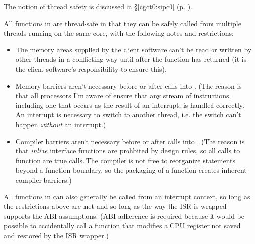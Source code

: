 The notion of thread safety is discussed 
in \S{}\ref{cgct0:sipc0} (p.  \pageref{cgct0:sipc0}).  

All functions in \emph{\productbasenameshort{}} are 
thread-safe in that they can be safely called from multiple 
threads running on the same core, with the following notes 
and restrictions: 

\begin{itemize}
\item The memory areas supplied by the client software
      can't be read or written by other threads in a 
      conflicting way until after the
      \emph{\productbasenameshort{}} function has returned
      (it is the client software's responsibility to ensure 
      this).
\item Memory barriers aren't necessary before or after calls
      into \emph{\productbasenameshort{}}\@.  (The reason is 
      that all processors I'm aware of ensure that any 
      stream of instructions, including one that
      occurs as the result of an interrupt, is handled
      correctly.  An interrupt is necessary to switch to 
      another thread, i.e. the switch can't happen
      \emph{without} an interrupt.)
\item Compiler barriers aren't necessary before or after
      calls into \emph{\productbasenameshort{}}\@.  (The  
      reason is that \emph{inline} 
      interface functions are prohbited by 
      \emph{\productbasenameshort{}} design rules, so all
      calls to \emph{\productbasenameshort{}} function
      are true calls.  The compiler is not free to 
      reorganize statements beyond a function
      boundary, so the packaging of a function creates
      inherent compiler barriers.)
\end{itemize}

All functions in \emph{\productbasenameshort{}} can also 
generally be called from an interrupt context, so long as 
the restrictions above are met and so long as the way the 
ISR is wrapped supports the ABI assumptions\@.  (ABI 
adherence is required because it would be possible to 
accidentally call a \emph{\productbasenameshort{}} function 
that modifies a CPU register not saved and restored by the 
ISR wrapper.) 


